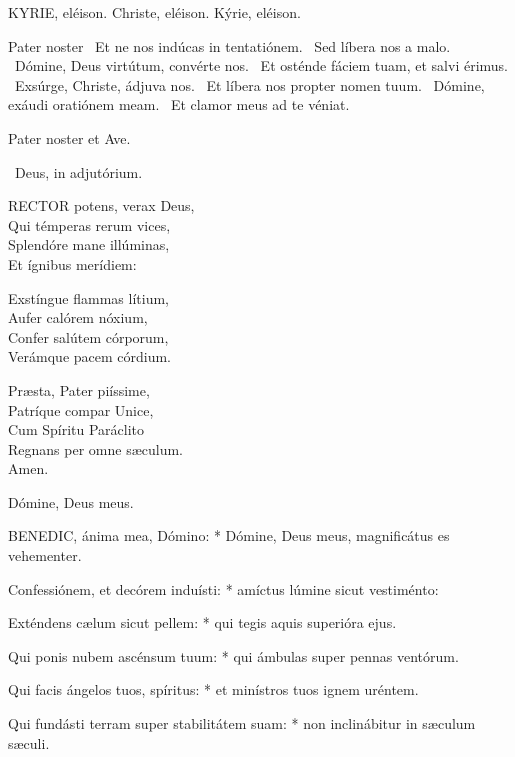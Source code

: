 

KYRIE, eléison. Christe, eléison. Kýrie, eléison.

Pater noster  \V\ Et ne nos indúcas in tentatiónem. \R\ Sed líbera nos a malo. \V\ Dómine, Deus virtútum, convérte nos. \R\ Et osténde fáciem tuam, et salvi érimus. \V\ Exsúrge, Christe, ádjuva nos. \R\ Et líbera nos propter nomen tuum. \V\ Dómine, exáudi oratiónem meam. \R\ Et clamor meus ad te véniat.



Pater noster et Ave.

\V\ Deus, in adjutórium.


\lettrine[lines=2]{R}{ECTOR} potens, verax Deus,\\
Qui témperas rerum vices,\\
Splendóre mane illúminas,\\
Et ígnibus merídiem:

Exstíngue flammas lítium,\\
Aufer calórem nóxium,\\
Confer salútem córporum,\\
Verámque pacem córdium.

Præsta, Pater piíssime,\\
Patríque compar Unice,\\
Cum Spíritu Paráclito\\
Regnans per omne sæculum.\\
Amen.

 Dómine, Deus meus.


\lettrine[lines=2]{B}{ENEDIC}, ánima mea, Dómino: * Dómine, Deus meus, magnificátus es vehementer.

Confessiónem, et decórem induísti: * amíctus lúmine sicut vestiménto:

Exténdens cælum sicut pellem: * qui tegis aquis superióra ejus.

Qui ponis nubem ascénsum tuum: * qui ámbulas super pennas ventórum.

Qui facis ángelos tuos, spíritus: * et minístros tuos ignem uréntem.

Qui fundásti terram super stabilitátem suam: * non inclinábitur in sæculum sæculi.

